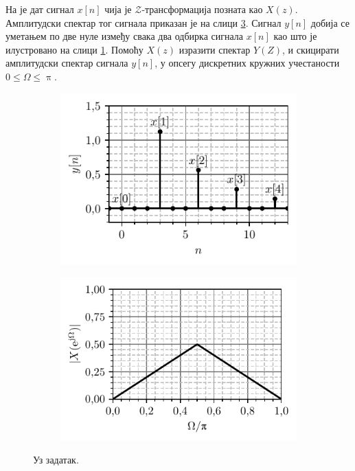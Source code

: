 \PID На је дат сигнал $x[n]$ чија је $\mathcal{Z}$-трансформација позната као $X(z)$. Амплитудски 
спектар тог сигнала приказан је на слици \ref{\ID.um.jw}. Сигнал $y[n]$ добија се уметањем по 
две нуле између свака два одбирка сигнала $x[n]$ као што је илустровано на слици \ref{\ID.um.x}.
Помоћу $X(z)$ изразити спектар $Y(Z)$, и скицирати амплитудски спектар сигнала $y[n]$, у опсегу
дискретних кружних учестаности $0 \leq \Omega \leq \uppi$.

%
\begin{figure}[ht!]
    \centering
    \begin{subfigure}{0.49\textwidth}
        \includegraphics{fig/umetanje_def.pdf}
        \caption{}
        \label{\ID.um.x}    
    \end{subfigure}
    \begin{subfigure}{0.49\textwidth}
        \includegraphics{fig/umetanje_x_jw.pdf}
        \caption{}
        \label{\ID.um.jw}    
    \end{subfigure}
    \caption{Уз задатак.}
\end{figure}
